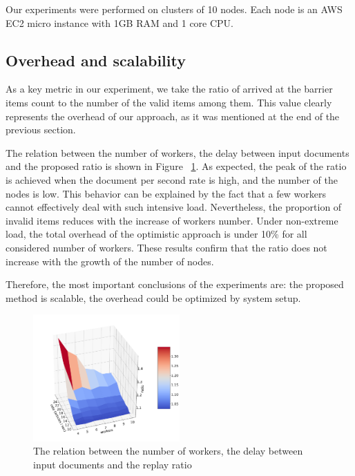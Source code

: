 Our experiments were performed on clusters of 10 nodes. Each node is an AWS EC2 micro instance with 1GB RAM and 1 core CPU.

\subsection{Overhead and scalability}

As a key metric in our experiment, we take the ratio of arrived at the barrier items count to the number of the valid items among them. This value clearly represents the overhead of our approach, as it was mentioned at the end of the previous section. 

The relation between the number of workers, the delay between input documents and the proposed ratio is shown in Figure ~\ref{experiment}. As expected, the peak of the ratio is achieved when the document per second rate is high, and the number of the nodes is low. This behavior can be explained by the fact that a few workers cannot effectively deal with such intensive load. Nevertheless, the proportion of invalid items reduces with the increase of workers number. Under non-extreme load, the total overhead of the optimistic approach is under 10\% for all considered number of workers. These results confirm that the ratio does not increase with the growth of the number of nodes.

Therefore, the most important conclusions of the experiments are: the proposed method is scalable, the overhead could be optimized by system setup.

\begin{figure}[htbp]
  \centering
  \includegraphics[width=0.5\textwidth]{pics/experiment}
  \caption{The relation between the number of workers, the delay between input documents and the replay ratio}
  \label {experiment}
\end{figure}
